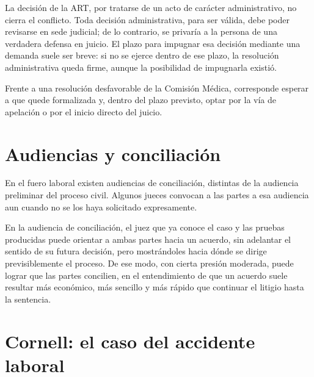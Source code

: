\documentclass[12pt,oneside]{book}
\begin{document}
\begin{important}
La decisión de la ART, por tratarse de un acto de carácter administrativo, no cierra el conflicto. Toda decisión administrativa, para ser válida, debe poder revisarse en sede judicial; de lo contrario, se privaría a la persona de una verdadera defensa en juicio. El plazo para impugnar esa decisión mediante una demanda suele ser breve: si no se ejerce dentro de ese plazo, la resolución administrativa queda firme, aunque la posibilidad de impugnarla existió.
\end{important}

Frente a una resolución desfavorable de la Comisión Médica, corresponde esperar a que quede formalizada y, dentro del plazo previsto, optar por la vía de apelación o por el inicio directo del juicio.

\section{Audiencias y conciliación}

En el fuero laboral existen audiencias de conciliación, distintas de la audiencia preliminar del proceso civil. Algunos jueces convocan a las partes a esa audiencia aun cuando no se los haya solicitado expresamente.

\begin{important}
En la audiencia de conciliación, el juez que ya conoce el caso y las pruebas producidas puede orientar a ambas partes hacia un acuerdo, sin adelantar el sentido de su futura decisión, pero mostrándoles hacia dónde se dirige previsiblemente el proceso. De ese modo, con cierta presión moderada, puede lograr que las partes concilien, en el entendimiento de que un acuerdo suele resultar más económico, más sencillo y más rápido que continuar el litigio hasta la sentencia.
\end{important}

\section*{Cornell: el caso del accidente laboral}
\end{document}
